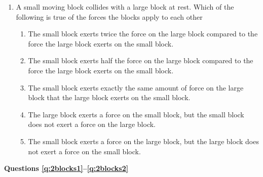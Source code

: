 \documentclass{../../../oss-apphys}
\begin{document}
\genheader


\genmultidirections

\gengravity

\raggedcolumns
\begin{multicols}{2}
  \begin{enumerate}[leftmargin=18pt]
  \item A small moving block collides with a large block at rest. Which of the
    following is true of the forces the blocks apply to each other
    \begin{enumerate}[noitemsep,topsep=0pt,leftmargin=18pt,label=(\Alph*)]
    \item The small block exerts twice the force on the large block
      compared to the force the large block exerts on the small block.
    \item The small block exerts half the force on the large block compared
      to the force the large block exerts on the small block.
    \item The small block exerts exactly the same amount of force on the
      large block that the large block exerts on the small block.
    \item The large block exerts a force on the small block, but the small
      block does not exert a force on the large block.
    \item The small block exerts a force on the large block, but the large
      block does not exert a force on the small block.
    \end{enumerate}
    \vspace{.6in}
  \end{enumerate}
  
  \textbf{Questions \ref{q:2blocks1}--\ref{q:2blocks2}}


\end{multicols}
\end{document}
